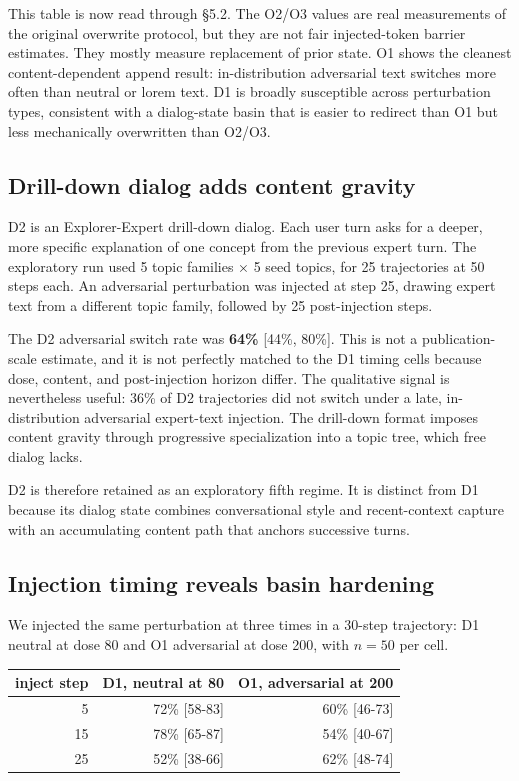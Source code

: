 \documentclass{article}
\theoremstyle{plain}
\theoremstyle{definition}
\begin{document}
This table is now read through §5.2. The O2/O3 values are real measurements of the original overwrite protocol, but they are not fair injected-token barrier estimates. They mostly measure replacement of prior state. O1 shows the cleanest content-dependent append result: in-distribution adversarial text switches more often than neutral or lorem text. D1 is broadly susceptible across perturbation types, consistent with a dialog-state basin that is easier to redirect than O1 but less mechanically overwritten than O2/O3.

\subsection{Drill-down dialog adds content gravity}

D2 is an Explorer-Expert drill-down dialog. Each user turn asks for a deeper, more specific explanation of one concept from the previous expert turn. The exploratory run used 5 topic families × 5 seed topics, for 25 trajectories at 50 steps each. An adversarial perturbation was injected at step 25, drawing expert text from a different topic family, followed by 25 post-injection steps.

The D2 adversarial switch rate was \textbf{64\%} [44\%, 80\%]. This is not a publication-scale estimate, and it is not perfectly matched to the D1 timing cells because dose, content, and post-injection horizon differ. The qualitative signal is nevertheless useful: 36\% of D2 trajectories did not switch under a late, in-distribution adversarial expert-text injection. The drill-down format imposes content gravity through progressive specialization into a topic tree, which free dialog lacks.

D2 is therefore retained as an exploratory fifth regime. It is distinct from D1 because its dialog state combines conversational style and recent-context capture with an accumulating content path that anchors successive turns.

\subsection{Injection timing reveals basin hardening}

We injected the same perturbation at three times in a 30-step trajectory: D1 neutral at dose 80 and O1 adversarial at dose 200, with $n=50$ per cell.

\begin{table}[h!]
\centering
\small
\begin{tabular}{rrr}
\toprule
inject step & D1, neutral at 80 & O1, adversarial at 200 \\
\midrule
5 & 72\% [58-83] & 60\% [46-73] \\
15 & 78\% [65-87] & 54\% [40-67] \\
25 & 52\% [38-66] & 62\% [48-74] \\
\bottomrule
\end{tabular}
\end{table}
\end{document}
